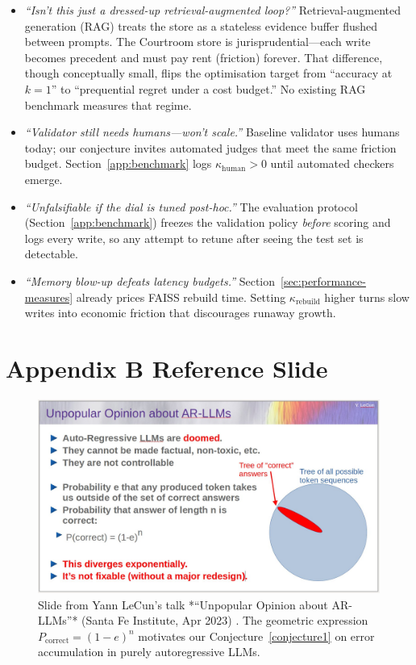 \documentclass[11pt]{article}
\begin{document}
\begin{itemize}
\item \emph{“Isn't this just a dressed-up retrieval-augmented loop?”} Retrieval-augmented generation (RAG) treats the store as a stateless evidence buffer flushed between prompts. The Courtroom store is jurisprudential—each write becomes precedent and must pay rent (friction) forever. That difference, though conceptually small, flips the optimisation target from “accuracy at \(k = 1\)” to “prequential regret under a cost budget.” No existing RAG benchmark measures that regime.

\item \emph{“Validator still needs humans—won't scale.”}  Baseline validator uses humans today; our conjecture invites automated judges that meet the same friction budget. Section~\ref{app:benchmark} logs $\kappa_{\text{human}}>0$ until automated checkers emerge.

\item \emph{“Unfalsifiable if the dial is tuned post-hoc.”}
      The evaluation protocol (Section~\ref{app:benchmark}) freezes the validation policy
      \emph{before} scoring and logs every write, so any attempt to
      retune after seeing the test set is detectable.

\item \emph{“Memory blow-up defeats latency budgets.”}  Section~\ref{sec:performance-measures} already prices FAISS rebuild time.  Setting $\kappa_{\text{rebuild}}$ higher turns slow writes into economic friction that discourages runaway growth.
\end{itemize}

\section*{Appendix B  \quad  Reference Slide}
\begin{figure}[h]
  \centering
  \includegraphics[width=.9\linewidth]{figs/fig_lecun_ar_llm_slide.jpeg}
  \caption{Slide from Yann LeCun's talk *“Unpopular Opinion about
           AR-LLMs”* (Santa Fe Institute, Apr 2023) \citep{LeCun2023SFI}.
           The geometric expression
           $P_{\text{correct}} = (1-e)^{n}$ motivates
           our Conjecture~\ref{conjecture1} on error accumulation in purely autoregressive
           LLMs.}
  \label{fig:lecun-slide}
\end{figure}
\end{document}
